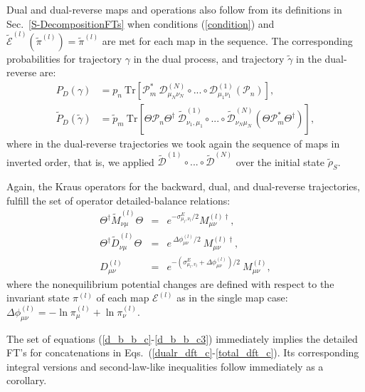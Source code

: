 \documentclass[aps,prx,twocolumn,showpacs,floatfix,superscriptaddress,graphics,longbibliography]{revtex4-1}
\newcommand{\tr}{\mathrm{Tr}}
\newcommand{\E}{{\mathcal E}}
\newcommand{\D}{{\mathcal D}}
\newcommand{\HAT}{}
\begin{document}
Dual and dual-reverse maps and operations also follow from its definitions in Sec.~\ref{S-DecompositionFTs} when conditions (\ref{condition}) and $\tilde{\E}^{(l)}(\tilde{\pi}^{(l)}) = \tilde{\pi}^{(l)}$ are met for each map in the sequence. 
The corresponding probabilities for trajectory $\gamma$ in the dual process, and trajectory $\tilde{\gamma}$ in the dual-reverse are:
\begin{align}
P_D (\gamma) &= p_n ~\tr[\HAT{\mathcal{P}}_m^\ast ~\D^{(N)}_{\mu_N \nu_N} \circ ... \circ \D^{(1)}_{\mu_1 \nu_1} (\HAT{\mathcal{P}}_n)],  \\
\tilde{P}_D (\tilde{\gamma}) &= \tilde{p}_m ~\tr[\HAT\Theta \HAT{\mathcal{P}}_n \HAT\Theta^\dagger ~\tilde{\D}^{(1)}_{\nu_1, \mu_1} \circ ... \circ \tilde{\D}^{(N)}_{\nu_N \mu_N} (\HAT\Theta \HAT{\mathcal{P}}_m^\ast \HAT\Theta^\dagger)], 
\end{align}
where in the dual-reverse trajectories we took again the sequence of maps in inverted order, that is, we applied $\tilde{\D}^{(1)} \circ ... \circ \tilde{\D}^{(N)}$ over the initial state $\tilde{\rho}_S$.  

Again, the Kraus operators for the backward, dual, and dual-reverse trajectories, fulfill the set of operator detailed-balance relations:
\begin{eqnarray}
\HAT\Theta^\dagger \HAT{\tilde{M}}_{\nu \mu}^{(l)} \HAT\Theta &=& e^{-\sigma^E_{\mu_{l}, \nu_{l}}/2}  \HAT{M}_{\mu \nu}^{(l) \dagger},  \label{d_b_b_c} \\ 
\HAT\Theta^\dagger \HAT{\tilde{D}}_{\nu \mu}^{(l)} \HAT\Theta &=& e^{~\Delta \phi_{\mu \nu}^{(l)} /2} ~ \HAT{M}_{\mu \nu}^{(l) \dagger},  \label{d_b_b_c2}\\  
\HAT{D}_{\mu \nu}^{(l)} ~&=& e^{-(\sigma^E_{\mu_{l}, v_{l}} + \Delta \phi_{\mu \nu}^{(l)})/2} ~\HAT{M}_{\mu \nu}^{(l)}, \label{d_b_b_c3}
\end{eqnarray}
where the nonequilibrium potential changes are defined with respect to the invariant state $\pi^{(l)}$ of each map $\E^{(l)}$ as in the single map case: $\Delta \phi^{(l)}_{\mu \nu} = - \ln \pi_{\mu}^{(l)} + \ln \pi_{\nu}^{(l)}$.

The set of equations (\ref{d_b_b_c}-\ref{d_b_b_c3}) immediately implies the detailed FT's for concatenations in Eqs.~(\ref{dualr_dft_c}-\ref{total_dft_c}).
Its corresponding integral versions and second-law-like inequalities follow immediately as a corollary. 
\end{document}
